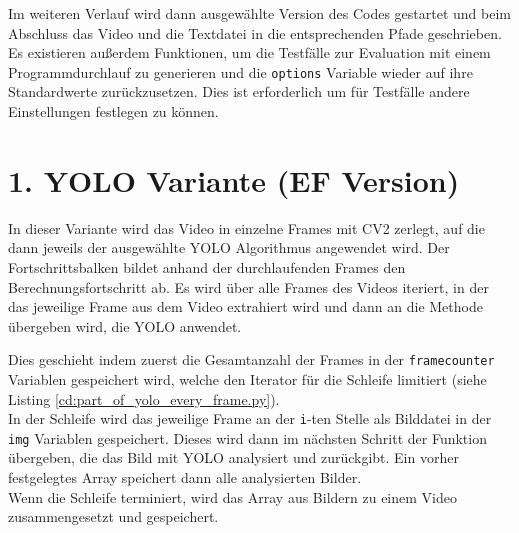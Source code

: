 {	
	Im weiteren Verlauf wird dann ausgewählte Version des Codes gestartet und beim Abschluss das Video und die Textdatei in die entsprechenden Pfade geschrieben.
	Es existieren außerdem Funktionen, um die Testfälle zur Evaluation mit einem Programmdurchlauf zu generieren und die \lstinline|options| Variable wieder auf ihre Standardwerte zurückzusetzen. Dies ist erforderlich um für Testfälle andere Einstellungen festlegen zu können.
}



\section{1. YOLO Variante (EF Version)} {
	\label{py:YOLO_every_frame}
	In dieser Variante wird das Video in einzelne Frames mit CV2 zerlegt, auf die dann jeweils der ausgewählte YOLO Algorithmus angewendet wird. Der Fortschrittsbalken bildet anhand der durchlaufenden Frames den Berechnungsfortschritt ab. 
	Es wird über alle Frames des Videos iteriert, in der das jeweilige Frame aus dem Video extrahiert wird und dann an die Methode übergeben wird, die YOLO anwendet. 
	
	Dies geschieht indem zuerst die Gesamtanzahl der Frames in der \lstinline|framecounter| Variablen gespeichert wird, welche den Iterator für die Schleife limitiert (siehe Listing \ref{cd:part_of_yolo_every_frame.py}). \\ 
	In der Schleife wird das jeweilige Frame an der \lstinline|i|-ten Stelle als Bilddatei in der \lstinline|img| Variablen gespeichert. Dieses wird dann im nächsten Schritt der Funktion übergeben, die das Bild mit YOLO analysiert und zurückgibt. Ein vorher festgelegtes Array speichert dann alle analysierten Bilder. \\ 
	Wenn die Schleife terminiert, wird das Array aus Bildern zu einem Video zusammengesetzt und gespeichert. \\

	
	
	
}

